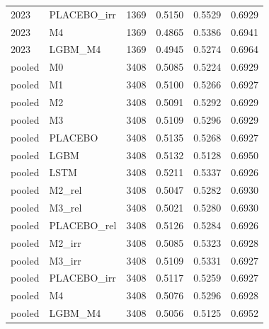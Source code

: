 \begin{tabular}{llrrrr}
2023 & PLACEBO\_irr & 1369 & 0.5150 & 0.5529 & 0.6929 \\
2023 & M4 & 1369 & 0.4865 & 0.5386 & 0.6941 \\
2023 & LGBM\_M4 & 1369 & 0.4945 & 0.5274 & 0.6964 \\
pooled & M0 & 3408 & 0.5085 & 0.5224 & 0.6929 \\
pooled & M1 & 3408 & 0.5100 & 0.5266 & 0.6927 \\
pooled & M2 & 3408 & 0.5091 & 0.5292 & 0.6929 \\
pooled & M3 & 3408 & 0.5109 & 0.5296 & 0.6929 \\
pooled & PLACEBO & 3408 & 0.5135 & 0.5268 & 0.6927 \\
pooled & LGBM & 3408 & 0.5132 & 0.5128 & 0.6950 \\
pooled & LSTM & 3408 & 0.5211 & 0.5337 & 0.6926 \\
pooled & M2\_rel & 3408 & 0.5047 & 0.5282 & 0.6930 \\
pooled & M3\_rel & 3408 & 0.5021 & 0.5280 & 0.6930 \\
pooled & PLACEBO\_rel & 3408 & 0.5126 & 0.5284 & 0.6926 \\
pooled & M2\_irr & 3408 & 0.5085 & 0.5323 & 0.6928 \\
pooled & M3\_irr & 3408 & 0.5109 & 0.5331 & 0.6927 \\
pooled & PLACEBO\_irr & 3408 & 0.5117 & 0.5259 & 0.6927 \\
pooled & M4 & 3408 & 0.5076 & 0.5296 & 0.6928 \\
pooled & LGBM\_M4 & 3408 & 0.5056 & 0.5125 & 0.6952 \\
\bottomrule
\end{tabular}
